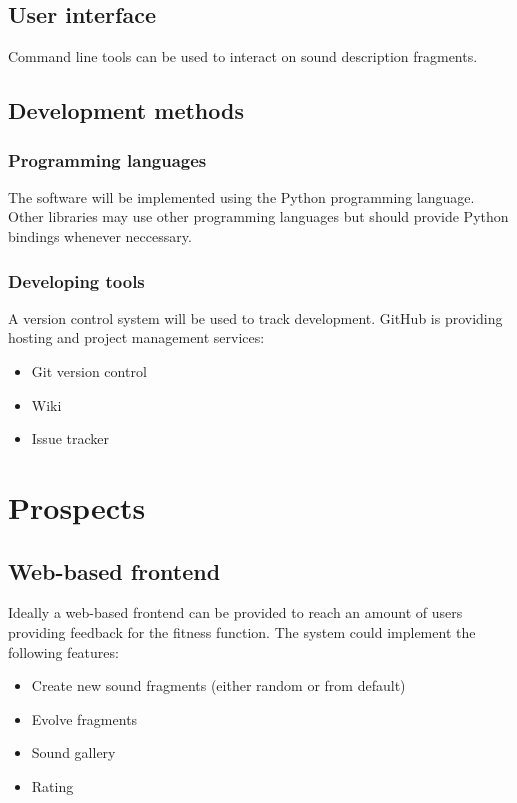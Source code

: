 \documentclass[a4paper,12pt,oneside]{article}
\begin{document}
\subsection{User interface}

Command line tools can be used to interact on sound description
fragments.

\subsection{Development methods}

\subsubsection*{Programming languages}

The software will be implemented using the Python programming
language. Other libraries may use other programming languages but
should provide Python bindings whenever neccessary.

\subsubsection*{Developing tools}

A version control system will be used to track development. GitHub is
providing hosting and project management services:

\begin{itemize}
\item Git version control
\item Wiki
\item Issue tracker
\end{itemize}

\section{Prospects}

\subsection{Web-based frontend}

Ideally a web-based frontend can be provided to reach an amount of
users providing feedback for the fitness function. The system could
implement the following features:

\begin{itemize}
\item Create new sound fragments (either random or from default)
\item Evolve fragments
\item Sound gallery
\item Rating
\end{itemize}
\end{document}

